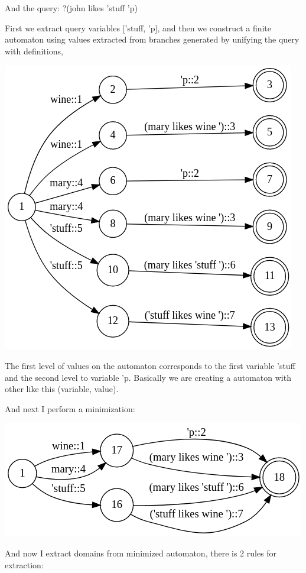 \documentclass{article}
\begin{document}
And the query: ?(john likes 'stuff 'p)

First we extract query variables ['stuff, 'p], and then we construct a finite automaton using 
values extracted from branches generated by unifying the query with definitions,

\includegraphics{sources/posts/variables domain (part 1)/john_likes_nfa.png}

The first level of values on the automaton corresponds to the first variable 'stuff and the 
second level to variable 'p. Basically we are creating a automaton with other like this (variable, value).

And next I perform a minimization:

\includegraphics{sources/posts/variables domain (part 1)/john_likes_min.png}

And now I extract domains from minimized automaton, there is 2 rules for extraction:
\end{document}

